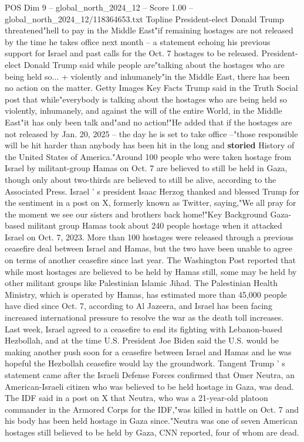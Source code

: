\begin{textsample}{POS Dim 9 – global\_north\_2024\_12 – Score 1.00 – global\_north\_2024\_12/118364653.txt}  \label{ex:f9_pos_335}
Topline President-elect Donald Trump threatened"hell to pay in the Middle East"if remaining hostages are not released by the time he takes office next month -- a statement echoing his previous support for Israel and past calls for the Oct. 7 hostages to be released.
President-elect Donald Trump said while people are"talking about the hostages who are being held so... + violently and inhumanely"in the Middle East, there has been no action on the matter.
Getty Images Key Facts Trump said in the Truth Social post that while"everybody is talking about the hostages who are being held so violently, inhumanely, and against the will of the entire World, in the Middle East"it has only been talk and"and no action!"He added that if the hostages are not released by Jan. 20, 2025 -- the day he is set to take office --"those responsible will be hit harder than anybody has been hit in the long and \textbf{storied} History of the United States of America."Around 100 people who were taken hostage from Israel by militant-group Hamas on Oct. 7 are believed to still be held in Gaza, though only about two-thirds are believed to still be alive, according to the Associated Press.
Israel ' s president Isaac Herzog thanked and blessed Trump for the sentiment in a post on X, formerly known as Twitter, saying,"We all pray for the moment we see our sisters and brothers back home!"Key Background Gaza-based militant group Hamas took about 240 people hostage when it attacked Israel on Oct. 7, 2023.
More than 100 hostages were released through a previous ceasefire deal between Israel and Hamas, but the two have been unable to agree on terms of another ceasefire since last year.
The Washington Post reported that while most hostages are believed to be held by Hamas still, some may be held by other militant groups like Palestinian Islamic Jihad.
The Palestinian Health Ministry, which is operated by Hamas, has estimated more than 45,000 people have died since Oct. 7, according to Al Jazeera, and Israel has been facing increased international pressure to resolve the war as the death toll increases.
Last week, Israel agreed to a ceasefire to end its fighting with Lebanon-based Hezbollah, and at the time U.S.
President Joe Biden said the U.S. would be making another push soon for a ceasefire between Israel and Hamas and he was hopeful the Hezbollah ceasefire would lay the groundwork.
Tangent Trump ' s statement came after the Israeli Defense Forces confirmed that Omer Neutra, an American-Israeli citizen who was believed to be held hostage in Gaza, was dead.
The IDF said in a post on X that Neutra, who was a 21-year-old platoon commander in the Armored Corps for the IDF,"was killed in battle on Oct. 7 and his body has been held hostage in Gaza since."Neutra was one of seven American hostages still believed to be held by Gaza, CNN reported, four of whom are dead.

\end{textsample}
